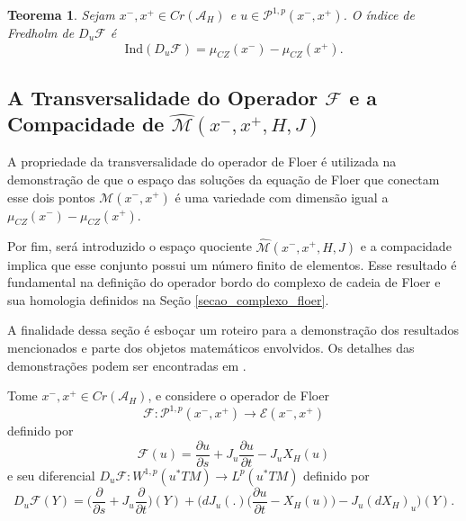 \documentclass[12pt]{book}
\newtheorem{teorema}{Teorema}[section]
\newcommand{\bigparenteses}[1]{\Big( #1 \Big) }
\newcommand{\caminhosexponenciaisconectantes}[2]{\mathcal{P}^{1,p}(#1, #2)}
\newcommand{\caminhosexponenciaisconectantespadrao}{\caminhosexponenciaisconectantes{x^{-}}{x^{+}}}
\newcommand{\diferencialfloerponto}[1]{D_{#1}\operadorFloer}
\newcommand{\derivadaparcial}[2]{\frac{\partial #1}{\partial #2}}
\newcommand{\diferencialhamiltoniano}[1]{(dX_{H})_{#1}}
\newcommand{\energiafinitaM}{\mathcal{M}}
\newcommand{\energiafinitaMconectante}{\energiafinitaM(x^{-}, x^{+})}
\newcommand{\espacoLp}[1]{L^{p}(#1)}
\newcommand{\espacosobolev}[1]{W^{1,p}(#1)}
\newcommand{\fibradocaminhosexponenciais}{\mathcal{E}(x^{-}, x^{+})}
\newcommand{\funcionalH}{\mathcal{A}_{H}}
\newcommand{\iconley}[1]{\iconleyabrev(#1)}
\newcommand{\iconleyabrev}{\mu_{CZ}}
\newcommand{\ind}{\text{Ind}}
\newcommand{\operadorFloer}{\mathcal{F}}
\newcommand{\operadorFloerDefinicao}[1]{\derivadaparcial{#1}{s} + J_{#1}\derivadaparcial{#1}{t} - J_{#1}X_{H}(#1)}
\newcommand{\operadorFloerParametro}[1]{\mathcal{F}(#1)}
\newcommand{\pontoscriticos}[1]{\textit{Cr}(#1)}
\newcommand{\pullbackfibradotangente}[2]{#1^{*}T#2}
\newcommand{\pullbackfibradotangenteM}[1]{\pullbackfibradotangente{#1}{M}}
\newcommand{\quocientetrajetorias}{\widehat{\energiafinitaM}(x^{-}, x^{+}, H, J)}
\begin{document}
	\begin{teorema}\label{teorema_indice_diferencial_operador_floer}
		Sejam $ x^{-}, x^{+} \in \pontoscriticos{\funcionalH}$ e $u\in \caminhosexponenciaisconectantespadrao$. O índice de Fredholm de $\diferencialfloerponto{u}$ é
		$$
		\ind(\diferencialfloerponto{u}) = \iconley{x^{-}}-\iconley{x^{+}}.
		$$
	\end{teorema}
	
	\subsection{A Transversalidade do Operador $\operadorFloer$ e a Compacidade de $\quocientetrajetorias$}\label{secao_transversalidade_compacidade_M}
	
	A propriedade da transversalidade do operador de Floer é utilizada na demonstração de que o espaço das soluções da equação de Floer que conectam esse dois pontos $\energiafinitaMconectante$ é uma variedade com dimensão igual a $\iconley{x^{-}}-\iconley{x^{+}}$.
	
	Por fim, será introduzido o espaço quociente $\quocientetrajetorias$ e a compacidade implica que esse conjunto possui um número finito de elementos. Esse resultado é fundamental na definição do operador bordo do complexo de cadeia de Floer e sua homologia definidos na Seção \ref{secao_complexo_floer}.
	
	A finalidade dessa seção é esboçar um roteiro para a demonstração dos resultados mencionados e parte dos objetos matemáticos envolvidos. Os detalhes das demonstrações podem ser encontradas em \cite{audi_floer_homology}.
	
	Tome $x^{-},x^{+}\in \pontoscriticos{\funcionalH}$, e considere o operador de Floer 
	$$
	\operadorFloer: \caminhosexponenciaisconectantespadrao \to \fibradocaminhosexponenciais
	$$  
	definido por
	$$
	\operadorFloerParametro{u} =\operadorFloerDefinicao{u}
	$$
	e seu diferencial $\diferencialfloerponto{u}: \espacosobolev{\pullbackfibradotangenteM{u}} \to \espacoLp{\pullbackfibradotangenteM{u}}$ definido por
	$$
	\diferencialfloerponto{u}(Y)= \Big( \derivadaparcial{}{s} + J_{u}\derivadaparcial {}{t}\Big)(Y)+ \Big(dJ_{u}(.)\bigparenteses{\derivadaparcial{u}{t} - X_{H}(u)} - J_{u} \diferencialhamiltoniano{u}\Big)(Y).
	$$
	
\end{document}
